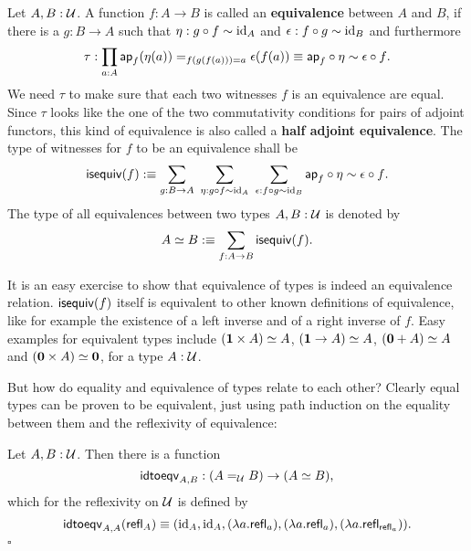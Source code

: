 \begin{defn}[Equivalences] \label{def:ishae-hott}
Let $A, B : \mathcal{U}$. A function $f : A \to B$ is called an \textbf{equivalence}
between $A$ and $B$, if there is a $g : B \to A$ such that
$\eta : g \circ f \sim \operatorname{id}_A$ and $\epsilon : f \circ g \sim \operatorname{id}_B$ and furthermore
\begin{equation*}
\tau : \prod_{a : A} \mathsf{ap}_f(\eta(a)) =_{f(g(f(a)))=a} \epsilon(f(a)) 
 \equiv \mathsf{ap}_f \circ \eta \sim \epsilon \circ f \text{.}
\end{equation*}
We need $\tau$ to make sure that each two witnesses $f$ is an equivalence are
equal.
Since $\tau$ looks like the one of the two commutativity conditions for pairs
of adjoint functors, this kind of equivalence is also called a \textbf{half
adjoint equivalence}.
The type of witnesses for $f$ to be an equivalence shall be
\begin{equation*}
\mathsf{isequiv}(f) :\equiv \sum_{g : B \to A} ~ \sum_{\eta : g \circ f \sim \operatorname{id}_A} ~
\sum_{\epsilon : f \circ g \sim \operatorname{id}_B} \mathsf{ap}_f \circ \eta \sim \epsilon \circ f \text{.}
\end{equation*}
The type of all equivalences between two types $A, B : \mathcal{U}$ is denoted by
\begin{equation*}
A \simeq B :\equiv \sum_{f : A \to B} \mathsf{isequiv}(f) \text{.}
\end{equation*}
\end{defn}

It is an easy exercise to show that equivalence of types is indeed an equivalence
relation. $\mathsf{isequiv}(f)$ itself is equivalent to other known definitions of equivalence,
like for example the existence of a left inverse and of a right inverse of $f$.
Easy examples for equivalent types include $(\mathbf{1} \times A) \simeq A$,
$(\mathbf{1} \to A) \simeq A$, $(\mathbf{0} + A) \simeq A$ and
$(\mathbf{0} \times A) \simeq \mathbf{0}$, for a type $A : \mathcal{U}$.

But how do equality and equivalence of types relate to each other?
Clearly equal types can be proven to be equivalent, just using path induction
on the equality between them and the reflexivity of equivalence:
\begin{lemma} \label{thm:idtoeqv-hott}
Let $A, B : \mathcal{U}$. Then there is a function
\begin{equation*}
\mathsf{idtoeqv}_{A, B} : (A =_{\mathcal{U}} B) \to (A \simeq B) \text{,}
\end{equation*}
which for the reflexivity on $\mathcal{U}$ is defined by
\begin{equation*}
\mathsf{idtoeqv}_{A,A} (\mathsf{refl}_A) \equiv (\operatorname{id}_A, \operatorname{id}_A, (\lambda a. \mathsf{refl}_a), (\lambda a. \mathsf{refl}_a),
(\lambda a. \mathsf{refl}_{\mathsf{refl}_a})) \text{.}
\end{equation*}
\hfill $\square$
\end{lemma}

